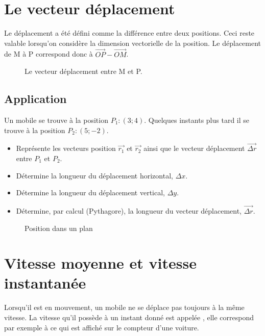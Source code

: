 \newpage

\section{Le vecteur déplacement}
Le déplacement a été défini comme la différence entre deux positions. Ceci reste valable lorsqu'on considère la dimension vectorielle de la position. Le déplacement de M à P correspond donc à \(\vec{OP} - \vec{OM}\).
\begin{figure}[!ht]
    \centering
    \resizebox{0.8\linewidth}{!}{}
    \caption{Le vecteur déplacement entre M et P.}
    \label{vecteur_deplacement}
\end{figure}

\newpage

\subsection{Application}
Un mobile se trouve à la position \(P_1 :(3 ; 4)\). Quelques instants plus tard il se trouve à la position \(P_2 :(5 ; -2)\).
\begin{itemize}[label= \textbullet]
    \item Représente les vecteurs position \(\vec{r_1}\) et \(\vec{r_2}\) ainsi que le vecteur déplacement \(\vec{\Delta r}\) entre \(P_1\) et \(P_2\).
    \item Détermine la longueur du déplacement horizontal, \(\Delta x\).
    \item Détermine la longueur du déplacement vertical, \(\Delta y\).
    \item Détermine, par calcul (Pythagore), la longueur du vecteur déplacement, \(\vec{\Delta r}\).
\end{itemize}
\begin{figure}[!ht]
    \centering
    \resizebox{0.8\linewidth}{!}{}
    \caption{Position dans un plan}
    \label{repere_cartesien}
\end{figure}

\newpage

\section{Vitesse moyenne et vitesse instantanée}
Lorsqu'il est en mouvement, un mobile ne se déplace pas toujours à la même vitesse. La vitesse qu'il possède à un instant donné est appelée , elle correspond par exemple à ce qui est affiché sur le compteur d'une voiture.\\

